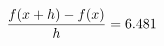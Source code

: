\documentclass[preview]{standalone}
\begin{document}
\begin{align*}
\special{dvisvgm:raw <g id='unique000'>}\frac{f(x+h)-f(x)}{h} = 6.481\special{dvisvgm:raw </g>}
\end{align*}
\end{document}
